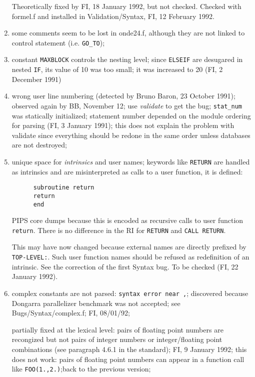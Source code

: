 \begin{enumerate}
	Theoretically fixed by FI, 18 January 1992, but not checked.
	Checked with formel.f and installed in Validation/Syntax,
	FI, 12 February 1992.

  \item some comments seem to be lost in onde24.f, although they are
	not linked to control statement (i.e. \verb+GO_TO+);

  \item constant \verb+MAXBLOCK+ controls the nesting level; since
	\verb+ELSEIF+ are desugared in nested \verb+IF+, its value of
	10 was too small; it was increased to 20 (FI, 2 December 1991)

  \item wrong user line numbering (detected by Bruno Baron, 23 October 1991);
	observed again by BB, November 12; use {\em validate} to get
	the bug; \verb+stat_num+ was statically initialized; statement
	number depended on the module ordering for parsing (FI, 3
	January 1991); this does not explain the problem with validate
	since everything should be redone in the same order unless
	databases are not destroyed;

  \item unique space for {\em intrinsics} and user names; keywords like
	\verb+RETURN+ are handled as intrinsics and are misinterpreted
	as calls to a user function, it is defined:

\begin{verbatim}
      subroutine return
      return
      end
\end{verbatim}

	PIPS core dumps because this is encoded as recursive calls to
	user function \verb+return+. There is no difference in the RI
	for \verb+RETURN+ and \verb+CALL RETURN+.

	This may have now changed because external names are directly prefixed
	by \verb+TOP-LEVEL:+. Such user function names should
	be refused as redefinition of an intrinsic. 
	See the correction of the first Syntax bug.
	To be checked (FI, 22 January 1992).

  \item \label{complex-constant}
	complex constants are not parsed: \verb+syntax error near ,+;
	discovered because Dongarra parallelizer benchmark was not
	accepted; see Bugs/Syntax/complex.f; FI, 08/01/92; 

	partially fixed at the lexical level: pairs of floating point
	numbers are recongized but not pairs of integer numbers or
	integer/floating point combinations (see paragraph 4.6.1 in
	the standard); FI, 9 January 1992; this does not work: pairs
	of floating point numbers can appear in a function call like
	\verb+FOO(1.,2.)+;back
	to the previous version;


\end{enumerate}
